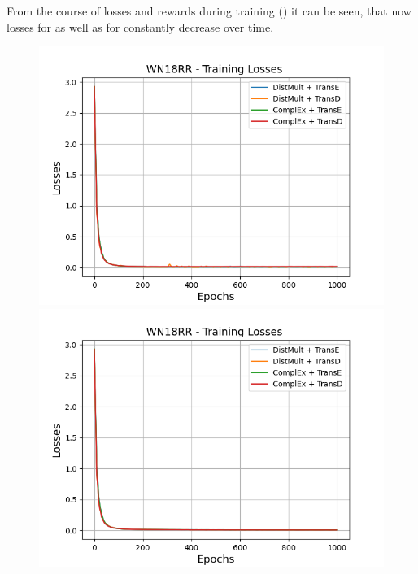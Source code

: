 From the course of losses and rewards during training () it can be seen, that now losses for \usmax as well as for \ussoftmax constantly decrease over time.
\begin{figure}
    \centering
    \begin{minipage}{.5\textwidth}
      \centering
      \includegraphics[width=0.9\linewidth]{figures/results/gan_train/not_pretrained/uncertainty/max/entropy/wn18rr/1k_epochs/uncertainty_wn18rr_losses.png}
    \end{minipage}%
    \begin{minipage}{.5\textwidth}
      \centering
      \includegraphics[width=0.9\linewidth]{figures/results/gan_train/not_pretrained/uncertainty/max_distribution/entropy/wn18rr/1k_epochs/uncertainty_wn18rr_losses.png}
    \end{minipage}

\end{figure}
